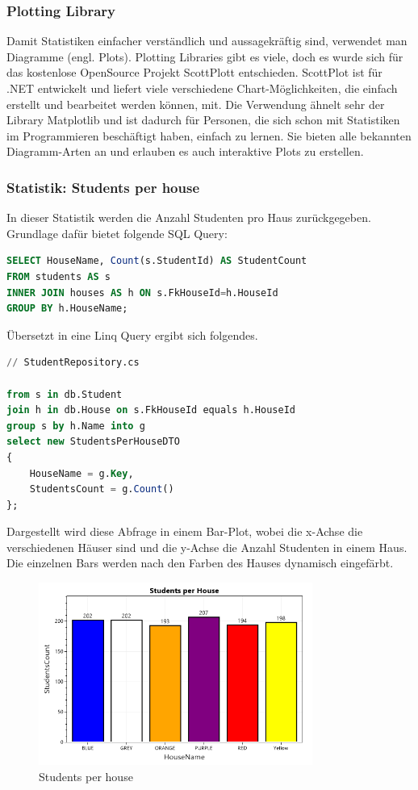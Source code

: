\documentclass[a4paper, table]{article}
\begin{document}
\subsubsection*{Plotting Library}
Damit Statistiken einfacher verständlich und aussagekräftig sind, verwendet man Diagramme (engl. Plots).
Plotting Libraries gibt es viele, doch es wurde sich für das kostenlose OpenSource Projekt ScottPlott entschieden.
ScottPlot ist für .NET entwickelt und liefert viele verschiedene Chart-Möglichkeiten, die einfach erstellt und bearbeitet werden können, mit.
Die Verwendung ähnelt sehr der Library Matplotlib und ist dadurch für Personen, die sich schon mit Statistiken im Programmieren beschäftigt haben, einfach zu lernen.
Sie bieten alle bekannten Diagramm-Arten an und erlauben es auch interaktive Plots zu erstellen. \autocite{}

\newpage
\subsubsection*{Statistik: Students per house}
In dieser Statistik werden die Anzahl Studenten pro Haus zurückgegeben.
Grundlage dafür bietet folgende SQL Query:

\begin{lstlisting}[language=SQL]
SELECT HouseName, Count(s.StudentId) AS StudentCount
FROM students AS s
INNER JOIN houses AS h ON s.FkHouseId=h.HouseId
GROUP BY h.HouseName;
\end{lstlisting}

Übersetzt in eine Linq Query ergibt sich folgendes.

\begin{lstlisting}[language=SQL]
// StudentRepository.cs

from s in db.Student
join h in db.House on s.FkHouseId equals h.HouseId
group s by h.Name into g
select new StudentsPerHouseDTO
{
    HouseName = g.Key,
    StudentsCount = g.Count()
};
\end{lstlisting}

Dargestellt wird diese Abfrage in einem Bar-Plot, wobei die x-Achse die verschiedenen Häuser sind und die y-Achse die Anzahl Studenten in einem Haus.
Die einzelnen Bars werden nach den Farben des Hauses dynamisch eingefärbt.

\begin{figure}[h]
    \centering
    \includegraphics[width=0.8\textwidth]{img/studentsPerHouse.png}
    \caption{Students per house}
    \label{fig:students-per-house}
\end{figure}
\end{document}
